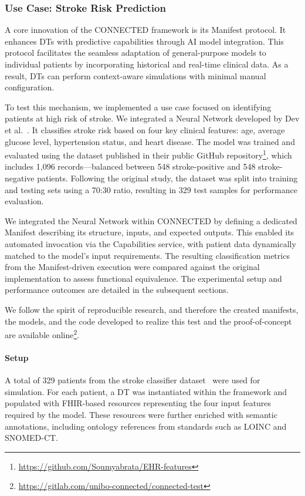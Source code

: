 \subsubsection{Use Case: Stroke Risk Prediction}
A core innovation of the CONNECTED framework is its Manifest protocol. It enhances DTs with predictive capabilities through AI model integration. This protocol facilitates the seamless adaptation of general-purpose models to individual patients by incorporating historical and real-time clinical data. As a result, DTs can perform context-aware simulations with minimal manual configuration.

To test this mechanism, we implemented a use case focused on identifying patients at high risk of stroke. We integrated a Neural Network developed by Dev et al.~\cite{dev_predictive_2022}. It classifies stroke risk based on four key clinical features: age, average glucose level, hypertension status, and heart disease. The model was trained and evaluated using the dataset published in their public GitHub repository\footnote{\url{https://github.com/Soumyabrata/EHR-features}}, which includes 1,096 records—balanced between 548 stroke-positive and 548 stroke-negative patients. Following the original study, the dataset was split into training and testing sets using a 70:30 ratio, resulting in 329 test samples for performance evaluation.

We integrated the Neural Network within CONNECTED by defining a dedicated Manifest describing its structure, inputs, and expected outputs. This enabled its automated invocation via the Capabilities service, with patient data dynamically matched to the model’s input requirements. The resulting classification metrics from the Manifest-driven execution were compared against the original implementation to assess functional equivalence. The experimental setup and performance outcomes are detailed in the subsequent sections.

We follow the spirit of reproducible research, and therefore the created manifests, the models, and the code developed to realize this test and the proof-of-concept are available online\footnote{\url{https://gitlab.com/unibo-connected/connected-test}}.

\paragraph{Setup}
A total of 329 patients from the stroke classifier dataset~\cite{dev_predictive_2022} were used for simulation. For each patient, a DT was instantiated within the framework and populated with FHIR-based resources representing the four input features required by the model. These resources were further enriched with semantic annotations, including ontology references from standards such as LOINC and SNOMED-CT.

